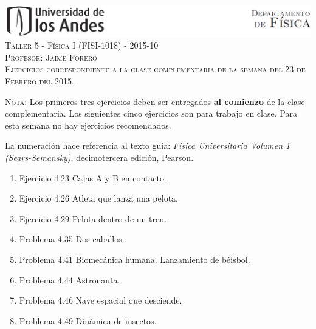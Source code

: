 \documentclass[letterpaper,10pt,onecolumn]{article}
\begin{document}
\begin{center}

\includegraphics[width=490pt]{figs/header.png}\\[0.5cm]

\textsc{\LARGE Taller 5 - F\'isica I (FISI-1018) - 2015-10}\\[0.5cm]

\textsc{\Large{Profesor: Jaime Forero}} \\[0.5cm]

\noindent\textsc{Ejercicios correspondiente a la clase complementaria
  de la semana del 23 de Febrero del 2015.}\\[0.5cm]
\end{center}

\noindent\textsc{Nota:} Los primeros tres ejercicios deben ser
entregados {\bf al comienzo} de la clase complementaria.  Los siguientes cinco ejercicios son para trabajo en clase.  Para esta semana no hay ejercicios recomendados. 

La numeraci\'on hace referencia al texto
gu\'ia: \textit{F\'isica Universitaria Volumen  1 (Sears-Semansky)},
decimotercera edici\'on, Pearson. 

\begin{enumerate}
\item Ejercicio 4.23 Cajas A y B en contacto.
\item Ejercicio 4.26 Atleta que lanza una pelota.
\item Ejercicio 4.29 Pelota dentro de un tren.
\item Problema 4.35 Dos caballos.
\item Problema 4.41 Biomec\'anica humana. Lanzamiento de b\'eisbol.
\item Problema 4.44 Astronauta.
\item Problema 4.46 Nave espacial que desciende.
\item Problema 4.49 Din\'amica de insectos.
\end{enumerate}
\end{document}
